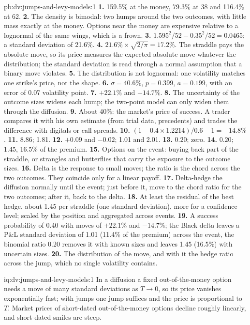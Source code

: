 \begin{solution}{pb:dv:jumps-and-levy-models:1}
\textbf{1.} 159.5\% at the money, 79.3\% at 38 and 116.4\% at 62.
\textbf{2.} The density is bimodal: two humps around the two outcomes, with little mass exactly at the money. Options
near the money are expensive relative to a lognormal of the same wings, which is a frown.
\textbf{3.} $1.595^2/52-0.35^2/52=0.0465$; a standard deviation of 21.6\%.
\textbf{4.} $21.6\%\times\sqrt{2/\pi}=17.2\%$. The straddle pays the absolute move, so its price measures the expected
absolute move whatever the distribution; the standard deviation is read through a normal assumption that a binary
move violates.
\textbf{5.} The distribution is not lognormal: one volatility matches one strike's price, not the shape.
\textbf{6.} $\sigma=40.6\%$, $p=0.399$, $a=0.199$, with an error of 0.07 volatility point.
\textbf{7.} $+22.1\%$ and $-14.7\%$.
\textbf{8.} The uncertainty of the outcome sizes widens each hump; the two-point model can only widen them through
the diffusion.
\textbf{9.} About 40\%: the market's price of success. A trader compares it with his own estimate (from trial data,
precedents) and trades the difference with digitals or call spreads.
\textbf{10.} $(1-0.4\times1.2214)/0.6-1=-14.8\%$.
\textbf{11.} 8.86; 1.81.
\textbf{12.} $+0.09$ and $-0.02$; 1.01 and 2.01.
\textbf{13.} $0.20$; zero.
\textbf{14.} $0.20$; 1.45, 16.5\% of the premium.
\textbf{15.} Options on the event: buying back part of the straddle, or strangles and butterflies that carry the
exposure to the outcome sizes.
\textbf{16.} Delta is the response to small moves; the ratio is the chord across the two outcomes. They coincide only
for a linear payoff.
\textbf{17.} Delta-hedge the diffusion normally until the event; just before it, move to the chord ratio for the
two outcomes; after it, back to the delta.
\textbf{18.} At least the residual of the best hedge, about 1.45 per straddle (one standard deviation), more for a
confidence level; scaled by the position and aggregated across events.
\textbf{19.} A success probability of 0.40 with moves of $+22.1\%$ and $-14.7\%$; the Black delta leaves a P\&L
standard deviation of 1.01 (11.4\% of the premium) across the event, the binomial ratio 0.20 removes it with known
sizes and leaves 1.45 (16.5\%) with uncertain sizes.
\textbf{20.} The distribution of the move, and with it the hedge ratio across the jump, which no single volatility
contains.
\end{solution}

\begin{solution}{iq:dv:jumps-and-levy-models:1}
In a diffusion a fixed out-of-the-money option needs a move of many standard deviations as $T\to0$, so its price
vanishes exponentially fast; with jumps one jump suffices and the price is proportional to $T$. Market prices of
short-dated out-of-the-money options decline roughly linearly, and short-dated smiles are steep.
\end{solution}

